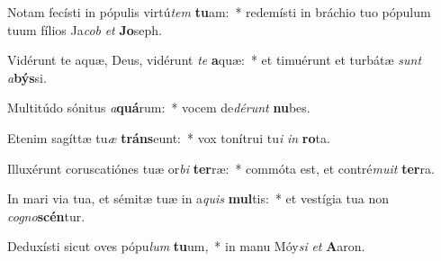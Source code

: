 \item Notam fecísti in pópulis virtú\textit{tem} \textbf{tu}am:~* redemísti in bráchio tuo pópulum tuum fílios Ja\textit{cob} \textit{et} \textbf{Jo}seph.
\item Vidérunt te aquæ, Deus, vidérunt \textit{te} \textbf{a}quæ:~* et timuérunt et turbátæ \textit{sunt} \textit{a}\textbf{býs}si.
\item Multitúdo sónitus \textit{a}\textbf{quá}rum:~* vocem de\textit{dé}\textit{runt} \textbf{nu}bes.
\item Etenim sagíttæ tu\textit{æ} \textbf{tráns}eunt:~* vox tonítrui tu\textit{i} \textit{in} \textbf{ro}ta.
\item Illuxérunt coruscatiónes tuæ or\textit{bi} \textbf{ter}ræ:~* commóta est, et contré\textit{mu}\textit{it} \textbf{ter}ra.
\item In mari via tua, et sémitæ tuæ in a\textit{quis} \textbf{mul}tis:~* et vestígia tua non \textit{co}\textit{gno}\textbf{scén}tur.
\item Deduxísti sicut oves pópu\textit{lum} \textbf{tu}um,~* in manu Móy\textit{si} \textit{et} \textbf{A}aron.
